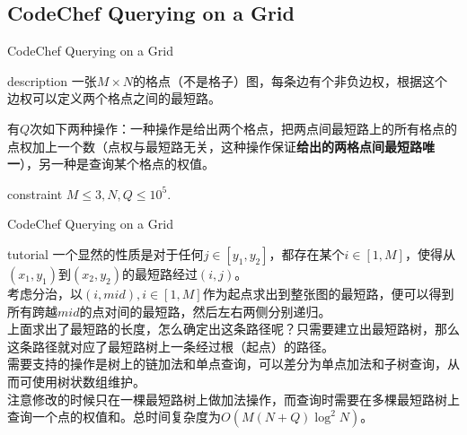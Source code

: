 \documentclass{beamer}
\begin{document}
\subsection{CodeChef Querying on a Grid}
\begin{frame}{CodeChef Querying on a Grid}
	\begin{block}{description}
		一张$M \times N$的格点（不是格子）图，每条边有个非负边权，根据这个边权可以定义两个格点之间的最短路。
		
		有$Q$次如下两种操作：一种操作是给出两个格点，把两点间最短路上的所有格点的点权加上一个数（点权与最短路无关，这种操作保证\textbf{给出的两格点间最短路唯一}），另一种是查询某个格点的权值。
	\end{block}
	\begin{block}{constraint}
		$M \le 3, N, Q \le 10^5.$
	\end{block}
\end{frame}
\begin{frame}{CodeChef Querying on a Grid}
	\begin{block}{tutorial}
		一个显然的性质是对于任何$j \in [y_1, y_2]$，都存在某个$i \in [1, M]$，使得从$(x_1, y_1)$到$(x_2, y_2)$的最短路经过$(i, j)$。\\
		
		考虑分治，以$(i, mid), i \in [1, M]$作为起点求出到整张图的最短路，便可以得到所有跨越$mid$的点对间的最短路，然后左右两侧分别递归。\\
		
		上面求出了最短路的长度，怎么确定出这条路径呢？只需要建立出最短路树，那么这条路径就对应了最短路树上一条经过根（起点）的路径。\\
		
		需要支持的操作是树上的链加法和单点查询，可以差分为单点加法和子树查询，从而可使用树状数组维护。\\
		
		注意修改的时候只在一棵最短路树上做加法操作，而查询时需要在多棵最短路树上查询一个点的权值和。总时间复杂度为$O(M(N+Q)\log^2 N)$。
	\end{block}
\end{frame}
\end{document}
